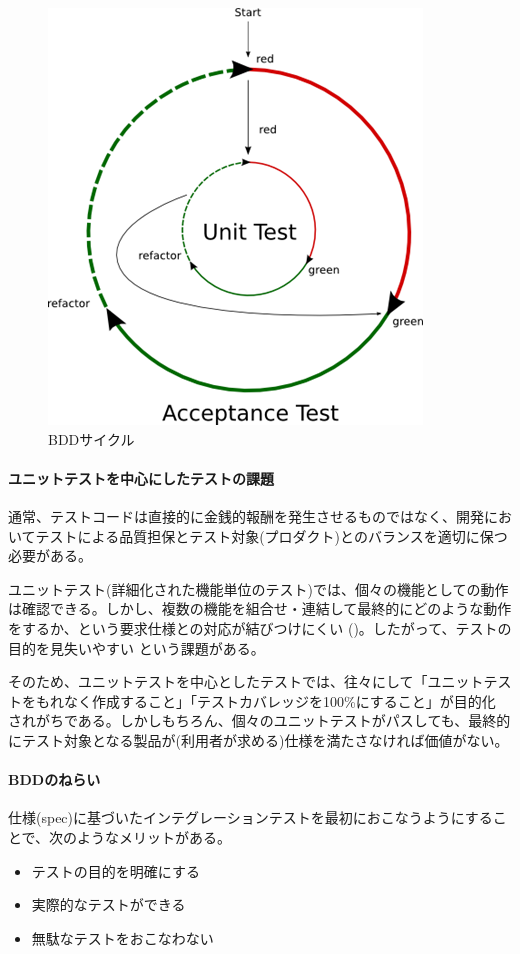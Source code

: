 \begin{figure}
 \vspace*{-\intextsep}
 \includegraphics[width=16zw]{img/bdd-cycle.png}
 \caption{BDDサイクル\cite{bdd-cycle-figref}}
 \label{fig:bdd-cycle}
\end{figure}

    \paragraph{ユニットテストを中心にしたテストの課題}
通常、テストコードは直接的に金銭的報酬を発生させるものではなく、開発にお
いてテストによる品質担保とテスト対象(プロダクト)とのバランスを適切に保つ
必要がある。

ユニットテスト(詳細化された機能単位のテスト)では、個々の機能としての動作
は確認できる。しかし、複数の機能を組合せ・連結して最終的にどのような動作
をするか、という要求仕様との対応が結びつけにくい
()。したがって、テストの目的を見失いやすい
という課題がある。

そのため、ユニットテストを中心としたテストでは、往々にして「ユニットテス
トをもれなく作成すること」「テストカバレッジを100\%にすること」が目的化
されがちである。しかしもちろん、個々のユニットテストがパスしても、最終的
にテスト対象となる製品が(利用者が求める)仕様を満たさなければ価値がない。

    \paragraph{BDDのねらい}
仕様(spec)に基づいたインテグレーションテストを最初におこなうようにするこ
とで、次のようなメリットがある。
\begin{itemize}
 \item テストの目的を明確にする
 \item 実際的なテストができる
 \item 無駄なテストをおこなわない
\end{itemize}


